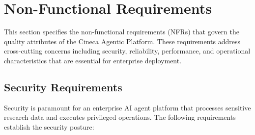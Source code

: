 
\section{Non-Functional Requirements}
\label{sec:nonfunctional-requirements}

This section specifies the non-functional requirements (NFRs) that govern the quality attributes of the Cineca Agentic Platform. These requirements address cross-cutting concerns including security, reliability, performance, and operational characteristics that are essential for enterprise deployment.

\subsection{Security Requirements}
\label{subsec:nfr-security}

Security is paramount for an enterprise AI agent platform that processes sensitive research data and executes privileged operations. The following requirements establish the security posture:

